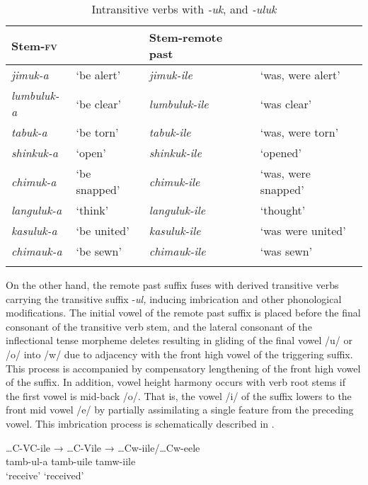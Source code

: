 \documentclass[output=paper]{langsci/langscibook}
\begin{document}
\begin{table}
\begin{tabularx}{\textwidth}{XXll}
\lsptoprule
Stem-\textsc{fv} &  & Stem-remote past & \\
\midrule
\textit{jimuk-a} & `be alert' & \textit{jimuk-ile} & `was, were alert' \\
\textit{lumbuluk-a} & `be clear' & \textit{lumbuluk-ile} & `was clear' \\
\textit{tabuk-a} & `be torn' & \textit{tabuk-ile} & `was, were torn' \\
\textit{shinkuk-a} & `open' & \textit{shinkuk-ile} & `opened' \\
\textit{chimuk-a} & `be snapped' & \textit{chimuk-ile} & `was, were snapped' \\
\textit{languluk-a} & `think' & \textit{languluk-ile} & `thought' \\
\textit{kasuluk-a} & `be united' & \textit{kasuluk-ile} & `was were united' \\
\textit{chimauk-a} & `be sewn' & \textit{chimauk-ile} & `was sewn' \\

\lspbottomrule
\end{tabularx}

\caption{Intransitive verbs with \textit{-uk}, and \textit{-uluk}}
\label{tab:22.kawasha}

\end{table}



On the other hand, the remote past suffix fuses with derived transitive verbs carrying the transitive suffix -\textit{ul,} inducing imbrication and other phonological modifications. The initial vowel of the remote past suffix is placed before the final consonant of the transitive verb stem, and the lateral consonant of the inflectional tense morpheme deletes resulting in gliding of the final vowel /u/ or /o/ into /w/ due to adjacency with the front high vowel of the triggering suffix. This process is accompanied by compensatory lengthening of the front high vowel of the suffix. In addition, vowel height harmony occurs with verb root stems if the first vowel is mid-back /o/. That is, the vowel /i/ of the suffix lowers to the front mid vowel /e/ by partially assimilating a single feature from the preceding vowel. This imbrication process is schematically described in .

\ea
\label{ex:7.kawasha}

\glll …C-VC-ile  →  …C-Vile  →  …Cw-iile/…Cw-eele \\
tamb-ul-a {}   tamb-uile {}   tamw-iile \\
‘receive’ {} {} {} ‘received’ \\
\end{document}
